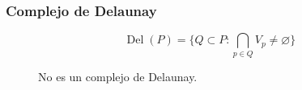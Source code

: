 \documentclass{beamer}
\DeclareMathOperator{\Del}{Del}
\begin{document}

\begin{frame}\frametitle{Complejo de Delaunay}
  \begin{Definicion}
  \begin{displaymath}
    \Del(P) = \lbrace Q\subset P \colon \bigcap_{p\in Q} V_p \ne \varnothing \rbrace
  \end{displaymath}
  \end{Definicion}
\begin{figure}[H]
\begin{columns}
  \centering{}
  \caption{\small No es un complejo de Delaunay.}
\end{columns}
\end{figure}
\end{frame}
\end{document}
